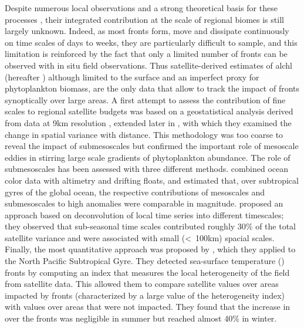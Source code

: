Despite numerous local observations and a strong theoretical basis for these processes \citep[e.g. recent studies by][]{marrec_2018, little_2018, verneil_2019, ruiz_2019, uchida_2020, kessouri_2020, tzortzis_2021}, their integrated contribution at the scale of regional biomes is still largely unknown.
Indeed, as most fronts form, move and dissipate continuously on time scales of days to weeks, they are particularly difficult to sample, and this limitation is reinforced by the fact that only a limited number of fronts can be observed with in situ field observations.
Thus satellite-derived estimates of al{chl} (hereafter ) although limited to the surface and an imperfect proxy for phytoplankton biomass, are the only data that allow to track the impact of fronts synoptically over large areas.
A first attempt to assess the contribution of fine scales to regional satellite  budgets was based on a geostatistical analysis derived from data at 9km resolution \citep{doney_2003}, extended later in \citet{glover_2018}, with which they examined the change in spatial variance with distance.
This methodology was too coarse to reveal the impact of submesoscales but confirmed the important role of mesoscale eddies in stirring large scale gradients of phytoplankton abundance.
The role of submesoscales has been assessed with three different methods.
\citet{guo_2019} combined ocean color data with altimetry and drifting floats, and estimated that, over subtropical gyres of the global ocean, the respective contributions of mesoscales and submesoscales to high  anomalies were comparable in magnitude.
\citet{keerthi_2022} proposed an approach based on deconvolution of local  time series into different timescales; they observed that sub-seasonal time scales contributed roughly 30\% of the total satellite  variance and were associated with small (\textless\ 100km) spacial scales.
Finally, the most quantitative approach was proposed by \citet{liu_2016}, which they applied to the North Pacific Subtropical Gyre.
They detected sea-surface temperature () fronts by computing an index that measures the local heterogeneity of the  field from satellite  data.
This allowed them to compare satellite  values over areas impacted by fronts (characterized by a large value of the heterogeneity index) with values over areas that were not impacted.
They found that the increase in  over the fronts was negligible in summer but reached almost 40\% in winter.

